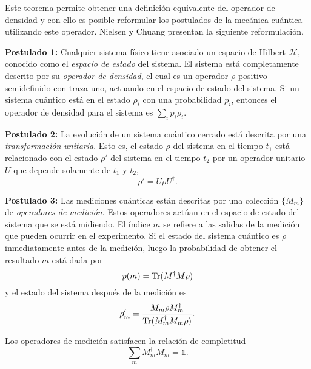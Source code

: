 Este teorema  permite obtener una definición equivalente del operador de densidad y con ello es posible reformular los postulados de la mecánica cuántica utilizando este operador. Nielsen y Chuang {\cite{nielsen_chuang_2010}} presentan la siguiente reformulación.


\setlength{\leftskip}{1cm}

 \textbf{Postulado 1:} Cualquier sistema físico tiene asociado un espacio de Hilbert $\mathcal{H}$, conocido como el \textit{espacio de estado} del sistema. El sistema está completamente descrito por su \textit{operador de densidad}, el cual es un operador $\rho$ positivo semidefinido con traza uno, actuando en el espacio de estado del sistema. Si un sistema cuántico está en el estado $\rho_i$ con una probabilidad $p_i$, entonces el operador de densidad para el sistema es $\sum_{i}p_i\rho_i$.


\textbf{Postulado 2:} La evolución de un sistema cuántico cerrado está descrita por una \textit{transformación unitaria}. Esto es, el estado $\rho$ del sistema en el tiempo $t_1$ está relacionado con el estado $\rho'$ del sistema en el tiempo $t_2$ por un operador unitario $U$ que depende solamente de $t_1$ y $t_2$, \begin{equation}\label{postulado 2}
\rho'=U\rho U^{\dagger}.
\end{equation}


\textbf{Postulado 3:} Las mediciones cuánticas están descritas por una
colección $\{M_m\}$ de \textit{operadores de medición}. Estos operadores actúan
en el espacio de estado del sistema que se está midiendo. El índice $m$ se
refiere a las salidas de la medición que pueden ocurrir en el experimento. Si
el estado del sistema cuántico es $\rho$ inmediatamente antes de la medición,
luego la probabilidad de obtener el resultado $m$ está dada por
\begin{equation}\label{probaility3postulate}
	p(m)={\rm Tr}(M^\dagger M \rho)
\end{equation} y el estado del sistema después de la medición es  \begin{equation}\label{state3postulate}
	\rho_m'=\dfrac{M_m\rho M_m^\dagger}{{\rm Tr}(M_m^\dagger M_m \rho)}.
\end{equation}

Los operadores de medición satisfacen la relación de completitud \begin{equation}\label{completitud3postulate}
	  	\sum_m M_m^\dagger M_m=\mathds{1}.
\end{equation}

